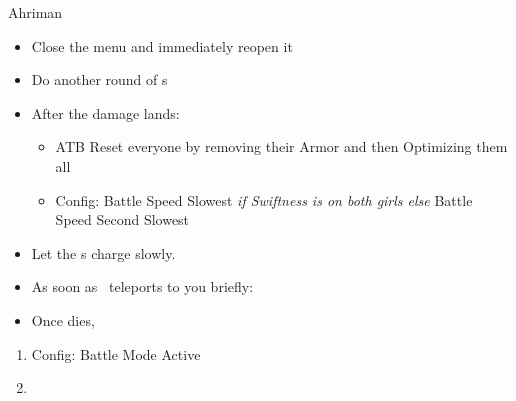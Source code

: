 \begin{battle}{Ahriman}
\begin{itemize}
\begin{menu}
\end{menu}
\item Close the menu and immediately reopen it
\begin{menu}
\begin{itemize}
\girlsin {}
\end{itemize}
\end{menu}
\item Do another round of \fira s
\item After the damage lands:
\begin{menu}
\begin{itemize}
	\item ATB Reset everyone by removing their Armor and then Optimizing them all
	\item Config: Battle Speed Slowest \textit{if Swiftness is on both girls else} Battle Speed Second Slowest
\end{itemize}
\end{menu}
\item Let the \fira s charge slowly.
\item As soon as \ teleports to you briefly:
\begin{itemize}
\end{itemize}
\item Once  dies, \GirlsGambitOff
\end{itemize}
\end{battle}
\begin{enumerate}[resume]
\item Config: Battle Mode Active
\item {}
\end{enumerate}